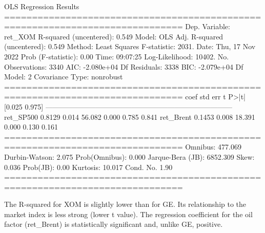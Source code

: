 \begin{ioutput}
OLS Regression Results                                
==============================================================================
Dep. Variable:                ret_XOM   R-squared (uncentered):          0.549
Model:                            OLS   Adj. R-squared (uncentered):     0.549
Method:                 Least Squares   F-statistic:                     2031.
Date:                Thu, 17 Nov 2022   Prob (F-statistic):               0.00
Time:                        09:07:25   Log-Likelihood:                 10402.
No. Observations:                3340   AIC:                        -2.080e+04
Df Residuals:                    3338   BIC:                        -2.079e+04
Df Model:                           2                                                  
Covariance Type:            nonrobust                                                  
==============================================================================
coef    std err          t      P>|t|      [0.025      0.975]
------------------------------------------------------------------------------
ret_SP500      0.8129      0.014     56.082      0.000       0.785       0.841
ret_Brent      0.1453      0.008     18.391      0.000       0.130       0.161
==============================================================================
Omnibus:                      477.069   Durbin-Watson:                   2.075
Prob(Omnibus):                  0.000   Jarque-Bera (JB):             6852.309
Skew:                           0.036   Prob(JB):                         0.00
Kurtosis:                      10.017   Cond. No.                         1.90
==============================================================================
\end{ioutput}

The R-squared for XOM is slightly lower than for GE. Its relationship to the market index is less strong (lower t value).
The regression coefficient for the oil factor (ret\_Brent) is statistically significant and, unlike GE, positive.


